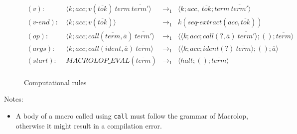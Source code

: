 \documentclass[a4paper, 12pt]{article}
\begin{document}
\begin{figure}[h]
    \caption{Computational rules}

    \begin{align*}
        (v): \ & \langle k; acc; v(\overline{tok}) \ term \ \overline{term'} \rangle & \to_1 &
            \langle k; acc, \ \overline{tok}; term \ \overline{term'} \rangle \\
        (v\mbox{-}end): \ & \langle k; acc; v(\overline{tok}) \rangle & \to_1 &
            k(seq\mbox{-}extract(acc, \overline{tok})) \\
        (op): \ & \langle k; acc; call(\overline{term}, \overline{a}) \ \overline{term'} \rangle & \to_1 &
            \langle \langle k; acc; call(?, \overline{a}) \ \overline{term'} \rangle; (); \overline{term} \rangle \\
        (args): \ & \langle k; acc; call(ident, \overline{a}) \ \overline{term} \rangle & \to_1 &
            \langle \langle k; acc; ident(?) \ \overline{term} \rangle; (); \overline{a} \rangle \\
        (start): \ & MACROLOP\_EVAL(\overline{term}) & \to_1 &
            \langle halt; (); \overline{term} \rangle \\
    \end{align*}
\end{figure}

Notes:

\begin{itemize}
    \item A body of a macro called using \texttt{call} must follow the grammar of
    Macrolop, otherwise it might result in a compilation error.
\end{itemize}
\end{document}
